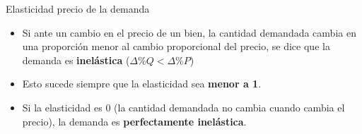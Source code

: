 \documentclass{beamer}
\begin{document}
\begin{frame}{Elasticidad precio de la demanda}
    \begin{itemize}
      \item Si ante un cambio en el precio de un bien, la cantidad demandada cambia en una proporción menor al cambio proporcional del precio, se dice que la demanda es \textbf{inelástica} ($\Delta \% Q <\Delta \% P$)
      \item Esto sucede siempre que la elasticidad sea \textbf{menor a 1}.
      \item Si la elasticidad es 0 (la cantidad demandada no cambia cuando cambia el precio), la demanda es \textbf{perfectamente inelástica}.
    \end{itemize}
    
  \begin{figure}[h]
  \centering
  \begin{minipage}{0.48\textwidth}
  \centering
  \end{minipage}
  \hfill
  \begin{minipage}{0.48\textwidth}
  \centering
  \end{minipage}
  
  \end{figure}
\end{frame}
\end{document}
